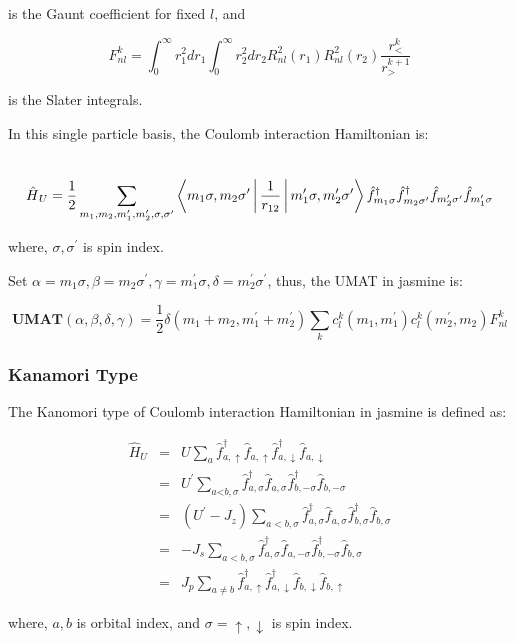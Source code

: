 is the Gaunt coefficient for fixed $l$, and

\begin{equation}
F_{nl}^{k}=\int_{0}^{\infty}r_{1}^{2}dr_{1}\int_{0}^{\infty}r_{2}^{2}dr_{2}R_{nl}^{2}(r_{1})R_{nl}^{2}(r_{2})\frac{r_{<}^{k}}{r_{>}^{k+1}}
\end{equation}


is the Slater integrals.

In this single particle basis, the Coulomb interaction Hamiltonian
is:

\begin{equation}
\end{equation}


\[
\]
\begin{equation}
\text{\ensuremath{\hat{H}}}_{U}=\frac{1}{2}\sum_{m_{1},m_{2},m_{1}^{\prime},m_{2}^{\prime},\sigma,\sigma^{\prime}}\Braket{m_{1}\sigma,m_{2}\sigma^{\prime}|\frac{1}{r_{12}}|m_{1}^{\prime}\sigma,m_{2}^{\prime}\sigma^{\prime}}\hat{f}_{m_{1}\sigma}^{\dagger}\hat{f}_{m_{2}\sigma^{\prime}}^{\dagger}\hat{f}_{m_{2}^{\prime}\sigma^{\prime}}\hat{f}_{m_{1}^{\prime}\sigma}
\end{equation}


where, $\sigma,\sigma^{\prime}$ is spin index.

Set $\alpha=m_{1}\sigma,\beta=m_{2}\sigma^{\prime},\gamma=m_{1}^{\prime}\sigma,\delta=m_{2}^{\prime}\sigma^{\prime}$,
thus, the UMAT in jasmine is:

\begin{equation}
\textbf{UMAT}(\alpha,\beta,\delta,\gamma)=\frac{1}{2}\delta(m_{1}+m_{2},m_{1}^{\prime}+m_{2}^{\prime})\sum_{k}c_{l}^{k}(m_{1},m_{1}^{\prime})c_{l}^{k}(m_{2}^{\prime},m_{2})F_{nl}^{k}
\end{equation}



\subsubsection{Kanamori Type}

The Kanomori type of Coulomb interaction Hamiltonian in jasmine is
defined as:

\begin{eqnarray*}
\hat{H}_{U} & = & U\sum_{a}\hat{f}_{a,\uparrow}^{\dagger}\hat{f}_{a,\uparrow}\hat{f}_{a,\downarrow}^{\dagger}\hat{f}_{a,\downarrow}\\
 & = & U^{\prime}\sum_{a\text{<}b,\sigma}\hat{f}_{a,\sigma}^{\dagger}\hat{f}_{a,\sigma}\hat{f}_{b,-\sigma}^{\dagger}\hat{f}_{b,-\sigma}\\
 & = & (U^{\prime}-J_{z})\sum_{a<b,\sigma}\hat{f}_{a,\sigma}^{\dagger}\hat{f}_{a,\sigma}\hat{f}_{b,\sigma}^{\dagger}\hat{f}_{b,\sigma}\\
 & = & -J_{s}\sum_{a<b,\sigma}\hat{f}_{a,\sigma}^{\dagger}\hat{f}_{a,-\sigma}\hat{f}_{b,-\sigma}^{\dagger}\hat{f}_{b,\sigma}\\
 & = & J_{p}\sum_{a\neq b}\hat{f}_{a,\uparrow}^{\dagger}\hat{f}_{a,\downarrow}^{\dagger}\hat{f}_{b,\downarrow}\hat{f}_{b,\uparrow}
\end{eqnarray*}


where, $a,b$ is orbital index, and $\sigma=\uparrow,\downarrow$
is spin index.

